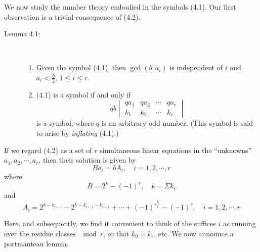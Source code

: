 We now study the number theory embodied in the symbols (4.1). Our first observation is a trivial consequence of (4.2).

\begin{description}

  \item[Lemma 4.1:] $\ $
    \begin{enumerate}[\hspace{1cm}(i)]
      \item Given the symbol (4.1), then $\gcd(b, a_{i})$ is independent of $i$ and $a_{i} < \frac{b}{2}$, $1 \leq i \leq r$.
      \item (4.1) is a symbol if and only if
        \begin{equation*}
        qb \begin{vmatrix}
        qa_{1} & qa_{2} & \cdots & qa_{r} \\
        k_{1} & k_{2} & \cdots & k_{r}
        \end{vmatrix} 
        \end{equation*}
        is a symbol, where $q$ is an arbitrary odd number. (This symbol is said to arise by \emph{inflating} (4.1).)
    \end{enumerate}

\end{description}

If we regard (4.2) as a set of $r$ simultaneous linear equations in the ``unknowns'' $a_{1}, a_{2}, \cdots, a_{r}$, then their solution is given by
\begin{equation}
Ba_{i} = bA_{i}, \quad i = 1,2,\cdots,r  \tag{4.3}
\end{equation}
where 
\begin{equation}
B = 2^{k} - (-1)^{r}, \quad k = \Sigma k_{i}  \tag{4.4}
\end{equation}
and 
\begin{equation}
A_{i} = 2^{k-k_{i-1}} - 2^{k-k_{i-1}-k_{i-2}} + \cdots + (-1)^{r_{2}^{k_{i}}} - (-1)^{r}, \quad i = 1,2,\cdots,r  \tag{4.5}
\end{equation}

Here, and subsequently, we find it convenient to think of the suffices $i$ as running over the residue classes $\mod{r}$, so that $k_{0} = k_{r}$, etc. We now announce a portmanteau lemma.

